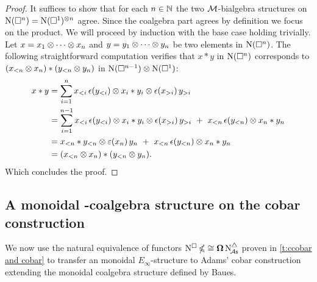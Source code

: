 \begin{proof}
	It suffices to show that for each $n \in \mathbb{N}$ the two $\mathcal{M}$-bialgebra structures on $\operatorname{N}(\square^n) = \operatorname{N}(\square^1)^{\otimes n}$ agree.
	Since the coalgebra part agrees by definition we focus on the product.
	We will proceed by induction with the base case holding trivially.
	Let $x = x_1 \otimes \dotsb \otimes x_n$ and $y = y_1 \otimes \dotsb \otimes y_n$ be two elements in $\operatorname{N}(\square^n)$.
	The following straightforward computation verifies that $x \ast y$ in $\operatorname{N}(\square^n)$ corresponds to $(x_{<n} \otimes x_n) \ast (y_{<n} \otimes y_n)$ in $\operatorname{N}(\square^{n-1}) \otimes \operatorname{N}(\square^1)$:
	\begin{align*}
		x \ast y &=
		\sum_{i=1}^n x_{<i}\, \epsilon(y_{<i}) \otimes x_i \ast y_i \otimes \epsilon(x_{>i}) \, y_{>i} \\ &=
		\sum_{i=1}^{n-1} x_{<i}\, \epsilon(y_{<i}) \otimes x_i \ast y_i \otimes \epsilon(x_{>i}) \, y_{>i} \ +\
		x_{<n}\, \epsilon(y_{<n}) \otimes x_n \ast y_n \\ &=
		x_{<n} \ast y_{<n} \otimes \operatorname{\varepsilon}(x_n)\, y_n \ +\ x_{<n}\, \epsilon(y_{<n}) \otimes x_n \ast y_n \\ &=
		(x_{<n} \otimes x_n) \ast (y_{<n} \otimes y_n).
	\end{align*}
	Which concludes the proof.
\end{proof}

\subsection{A monoidal \pdfEinfty-coalgebra structure on the cobar construction}\label{ss:e-infty on cobar}


We now use the natural equivalence of functors $\operatorname{N^{\square}} \operatorname{\mathbb{\Omega}} \cong \operatorname{\mathbf{\Omega}} \operatorname{N^{\triangle}_{\!{\mathcal{A}\mathsf{s}}}}$ proven in \cref{t:ccobar and cobar} to transfer an monoidal $E_\infty$-structure to Adams' cobar construction extending the monoidal coalgebra structure defined by Baues.


